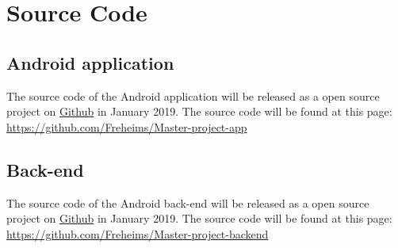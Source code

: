 \documentclass[../Main/thesis.tex]{subfiles}
\begin{document}
\chapter{Source Code}

\section{Android application}
The source code of the Android application will be released as a open source project on \href{http://github.com}{Github} in January 2019.
The source code will be found at this page: \url{https://github.com/Freheims/Master-project-app}

\section{Back-end}
The source code of the Android back-end will be released as a open source project on \href{http://github.com}{Github} in January 2019.
The source code will be found at this page: \url{https://github.com/Freheims/Master-project-backend}
\end{document}
